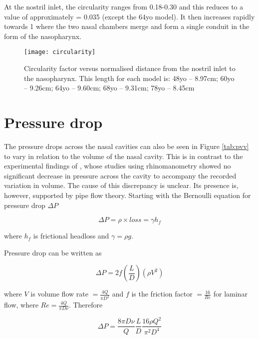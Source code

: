 At the nostril inlet, the circularity ranges from 0.18-0.30 and this reduces to a value of approximately = 0.035 (except the 64yo model). It then increases rapidly towards 1 where the two nasal chambers merge and form a single conduit in the form of the nasopharynx.







\begin{figure}
\centering
\texttt{[image: circularity]}
\caption{Circularity factor versus normalised distance from the nostril inlet to the nasopharynx. This length for each model is: 48yo – 8.97cm; 60yo – 9.26cm; 64yo – 9.60cm; 68yo – 9.31cm; 78yo – 8.45cm}
\label{fig:Circ}
\end{figure}

\section{Pressure drop}

The pressure drops across the nasal cavities can also be seen in Figure \ref{tab:pvv} to vary in relation to the volume of the nasal cavity. This is in contrast to the experimental findings of \cite{Lindemann2008, Edelstein1996, WhanKim2007}, whose studies using rhinomanometry showed no significant decrease in pressure across the cavity to accompany the recorded variation in volume. The cause of this discrepancy is unclear. Its presence is, however, supported by pipe flow theory.
Starting with the Bernoulli equation for pressure drop $\Delta P$ 

\begin{equation}
  \Delta P = \rho \times loss = \gamma h_f
\end{equation}

  where $h_f$ is frictional headloss and $\gamma = \rho g$.


Pressure drop can be written as

\begin{equation} \label{eq:1}
  \Delta P = 2f(\frac{L}{D})(\rho V^2)
\end{equation}

where $V$ is volume flow rate $= \frac{4Q}{\pi D^2}$ and $f$ is the friction factor $=\frac{16}{Re}$ for laminar flow, where $Re = \frac{4Q}{\pi D \nu}$. Therefore

\begin{equation}
  \Delta P = \frac{8\pi D \nu}{Q}\frac{L}{D}\frac{16\rho Q^2}{\pi^2D^4}
\end{equation}

